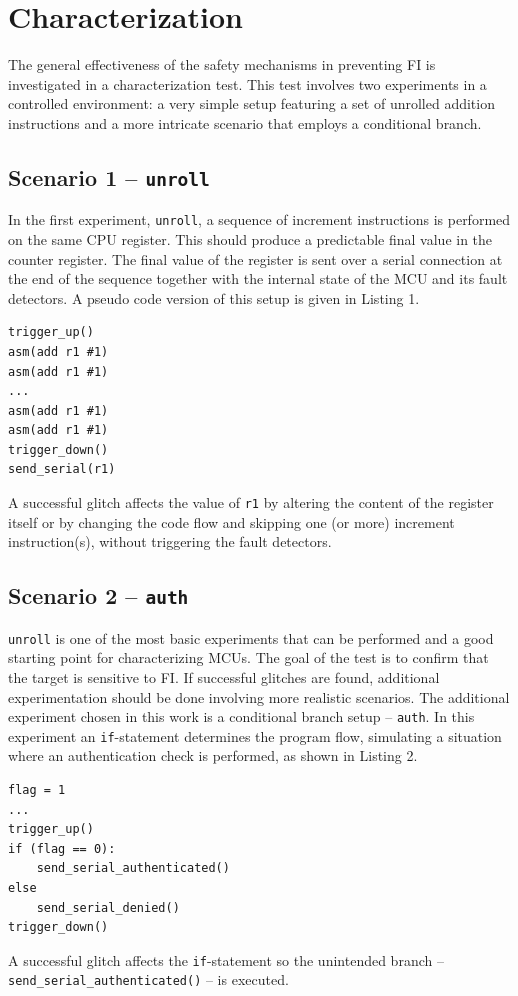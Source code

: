 \documentclass[10pt, conference, compsocconf]{IEEEtran}
\newcommand{\unroll}{\texttt{unroll}\xspace}
\newcommand{\auth}{\texttt{auth}\xspace}
\begin{document}
\section{Characterization}
\label{sec:char}
The general effectiveness of the safety mechanisms in preventing FI is investigated in a characterization test. This test involves two experiments in a controlled environment: a very simple setup featuring a set of unrolled addition instructions and a more intricate scenario that employs a conditional branch.

\subsection{Scenario 1 -- \unroll}
In the first experiment, \unroll, a sequence of increment instructions is performed on the same CPU register. This should produce a predictable final value in the counter register. The final value of the register is sent over a serial connection at the end of the sequence together with the internal state of the MCU and its fault detectors. A pseudo code version of this setup is given in Listing 1. 
\begin{lstlisting}[caption={\unroll scenario pseudo code}, captionpos=b]
trigger_up()
asm(add r1 #1)
asm(add r1 #1)
...
asm(add r1 #1)
asm(add r1 #1)
trigger_down()
send_serial(r1)
\end{lstlisting}
A successful glitch affects the value of \texttt{r1} by altering the content of the register itself or by changing the code flow and skipping one (or more) increment instruction(s), without triggering the fault detectors.

\subsection{Scenario 2 -- \auth}
\unroll is one of the most basic experiments that can be performed and a good starting point for characterizing MCUs. The goal of the test is to confirm that the target is sensitive to FI. If successful glitches are found, additional experimentation should be done involving more realistic scenarios. The additional experiment chosen in this work is a conditional branch setup -- \auth. In this experiment an \texttt{if}-statement determines the program flow, simulating a situation where an authentication check is performed, as shown in Listing 2.
\begin{lstlisting}[caption={\auth scenario pseudo code}, captionpos=b]
flag = 1
...
trigger_up()
if (flag == 0):
    send_serial_authenticated()
else
    send_serial_denied()
trigger_down()
\end{lstlisting}
A successful glitch affects the \texttt{if}-statement so the unintended branch -- \texttt{send\_serial\_authenticated()} -- is executed.
\end{document}
